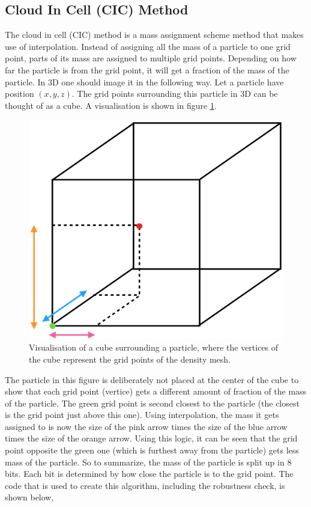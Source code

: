 \subsection{Cloud In Cell (CIC) Method}

The cloud in cell (CIC) method is a mass assignment scheme method that makes use of interpolation. Instead of assigning all the mass of a particle to one grid point, parts of its mass are assigned to multiple grid points. Depending on how far the particle is from the grid point, it will get a fraction of the mass of the particle. In 3D one should image it in the following way. Let a particle have position $(x,y,z)$. The grid points surrounding this particle in 3D can be thought of as a cube. A visualisation is shown in figure \ref{cube}.

\begin{figure}[h]
\centering
\includegraphics[scale=0.3]{cube}
\caption{Visualisation of a cube surrounding a particle, where the vertices of the cube represent the grid points of the density mesh.}
\label{cube}
\end{figure}
The particle in this figure is deliberately not placed at the center of the cube to show that each grid point (vertice) gets a different amount of fraction of the mass of the particle. The green grid point is second closest to the particle (the closest is the grid point just above this one). Using interpolation, the mass it gets assigned to is now the size of the pink arrow times the size of the blue arrow times the size of the orange arrow. Using this logic, it can be seen that the grid point opposite the green one (which is furthest away from the particle) gets less mass of the particle. So to summarize, the mass of the particle is split up in 8 bits. Each bit is determined by how close the particle is to the grid point. The code that is used to create this algorithm, including the robustness check, is shown below,


